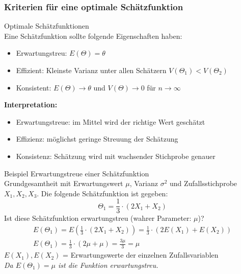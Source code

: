 \subsubsection{Kriterien für eine optimale Schätzfunktion}

\begin{concept}{Optimale Schätzfunktionen}\\
Eine Schätzfunktion sollte folgende Eigenschaften haben:

\begin{itemize}
    \item Erwartungstreu: $E(\Theta) = \theta$
    \item Effizient: Kleinste Varianz unter allen Schätzern $V(\Theta_1)<V(\Theta_2)$
    \item Konsistent: $E(\Theta) \to \theta$ und $V(\Theta) \to 0$ für $n \to \infty$
\end{itemize}

\textbf{Interpretation:}
\begin{itemize}
  \item Erwartungstreue: im Mittel wird der richtige Wert geschätzt
  \item Effizienz: möglichst geringe Streuung der Schätzung
  \item Konsistenz: Schätzung wird mit wachsender Stichprobe genauer
\end{itemize}
\end{concept}

\begin{example2}{Beispiel Erwartungstreue einer Schätzfunktion}\\
Grundgesamtheit mit Erwartungswert $\mu$, Varianz $\sigma^2$ und Zufallsstichprobe $X_1, X_2, X_3$. Die folgende Schätzfunktion ist gegeben:
$$
\Theta_1=\frac{1}{3} \cdot(2X_1+X_2)
$$
Ist diese Schätzfunktion erwartungstreu (wahrer Parameter: $\mu$)?
$$
\begin{gathered}
E(\Theta_1)=E(\frac{1}{3} \cdot(2X_1+X_2))=\frac{1}{3} \cdot(2E(X_1)+E(X_2)) \\
E(\Theta_1)=\frac{1}{3} \cdot(2\mu+\mu)=\frac{3\mu}{3}=\mu
\end{gathered}
$$
$E(X_1), E(X_2)$ = Erwartungswerte der einzelnen Zufallsvariablen\\

\textit{Da $E(\Theta_1)=\mu$ ist die Funktion erwartungstreu.}
\end{example2}

